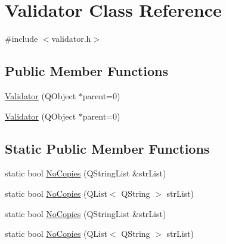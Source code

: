 \hypertarget{class_validator}{
\section{Validator Class Reference}
\label{class_validator}
}


{\ttfamily \#include $<$validator.h$>$}

\subsection*{Public Member Functions}
\begin{DoxyCompactItemize}
\item 
\hyperlink{class_validator_a1bde4f98459f3420794cdc475ca37dad}{Validator} (QObject $\ast$parent=0)
\item 
\hyperlink{class_validator_a1bde4f98459f3420794cdc475ca37dad}{Validator} (QObject $\ast$parent=0)
\end{DoxyCompactItemize}
\subsection*{Static Public Member Functions}
\begin{DoxyCompactItemize}
\item 
static bool \hyperlink{class_validator_a54b862c553a196e3a4e5f9f40d2aa208}{NoCopies} (QStringList \&strList)
\item 
static bool \hyperlink{class_validator_a9280ca8b1301884ee2151d89a8b8ad33}{NoCopies} (QList$<$ QString $>$ strList)
\item 
static bool \hyperlink{class_validator_ab9f89d21032b4913b9603fb60384365a}{NoCopies} (QStringList \&strList)
\item 
static bool \hyperlink{class_validator_a75f4fc3fe1c4ba3a2aad2d11d3a4a5c9}{NoCopies} (QList$<$ QString $>$ strList)
\end{DoxyCompactItemize}


